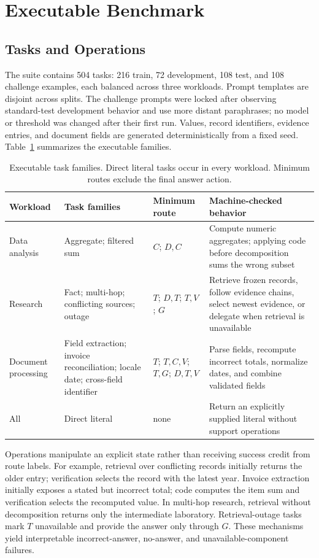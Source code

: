 \documentclass[letterpaper]{article} %
\begin{document}
\section{Executable Benchmark}

\subsection{Tasks and Operations}

The suite contains 504 tasks: 216 train, 72 development, 108 test, and 108 challenge examples, each balanced across three workloads. Prompt templates are disjoint across splits. The challenge prompts were locked after observing standard-test development behavior and use more distant paraphrases; no model or threshold was changed after their first run. Values, record identifiers, evidence entries, and document fields are generated deterministically from a fixed seed. Table~\ref{tab:tasks} summarizes the executable families.

\begin{table}[t]
\centering
\small
\caption{Executable task families. Direct literal tasks occur in every workload. Minimum routes exclude the final answer action.}
\label{tab:tasks}
\begin{tabular}{p{}p{}p{}p{}}
\toprule
Workload & Task families & Minimum route & Machine-checked behavior \\
\midrule
Data analysis & Aggregate; filtered sum & $C$; $D,C$ & Compute numeric aggregates; applying code before decomposition sums the wrong subset \\
Research & Fact; multi-hop; conflicting sources; outage & $T$; $D,T$; $T,V$; $G$ & Retrieve frozen records, follow evidence chains, select newest evidence, or delegate when retrieval is unavailable \\
Document processing & Field extraction; invoice reconciliation; locale date; cross-field identifier & $T$; $T,C,V$; $T,G$; $D,T,V$ & Parse fields, recompute incorrect totals, normalize dates, and combine validated fields \\
All & Direct literal & none & Return an explicitly supplied literal without support operations \\
\bottomrule
\end{tabular}
\end{table}

Operations manipulate an explicit state rather than receiving success credit from route labels. For example, retrieval over conflicting records initially returns the older entry; verification selects the record with the latest year. Invoice extraction initially exposes a stated but incorrect total; code computes the item sum and verification selects the recomputed value. In multi-hop research, retrieval without decomposition returns only the intermediate laboratory. Retrieval-outage tasks mark $T$ unavailable and provide the answer only through $G$. These mechanisms yield interpretable incorrect-answer, no-answer, and unavailable-component failures.
\end{document}
